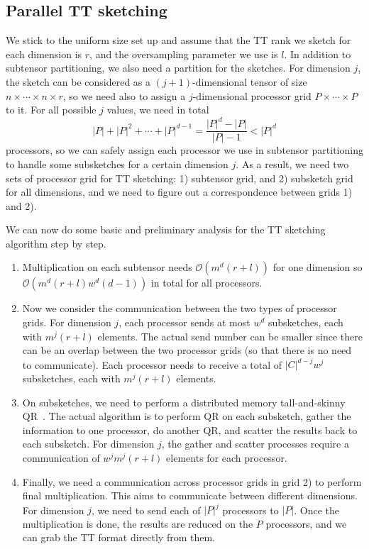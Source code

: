 \documentclass[11pt,a4paper,review]{siamart220329}
\begin{document}
\subsection{Parallel TT sketching}
We stick to the uniform size set up and assume that the TT rank we sketch for each dimension is $r$, and the oversampling parameter we use is $l$. In addition to subtensor partitioning, we also need a partition for the sketches. For dimension $j$, the sketch can be considered as a $(j+1)$-dimensional tensor of size $n \times \cdots \times n \times r$, so we need also to assign a $j$-dimensional processor grid $P \times \cdots \times P$ to it. For all possible $j$ values, we need in total
\[ |P|+|P|^2+\cdots+|P|^{d-1} = \frac{|P|^d-|P|}{|P|-1} < |P|^d \]
processors, so we can safely assign each processor we use in subtensor partitioning to handle some subsketches for a certain dimension $j$. As a result, we need two sets of processor grid for TT sketching: 1) subtensor grid, and 2) subsketch grid for all dimensions, and we need to figure out a correspondence between grids 1) and 2).

We can now do some basic and preliminary analysis for the TT sketching algorithm step by step.
\begin{enumerate}
\item Multiplication on each subtensor needs $\mathcal{O}(m^d(r+l))$ for one dimension so $\mathcal{O}(m^d(r+l)w^d(d-1))$ in total for all processors.

\item Now we consider the communication between the two types of processor grids. For dimension $j$, each processor sends at most $w^d$ subsketches, each with $m^j(r+l)$ elements. The actual send number can be smaller since there can be an overlap between the two processor grids (so that there is no need to communicate). Each processor needs to receive a total of $|C|^{d-j}w^j$ subsketches, each with $m^j(r+l)$ elements.

\item On subsketches, we need to perform a distributed memory tall-and-skinny QR~\cite{benson2013direct}. The actual algorithm is to perform QR on each subsketch, gather the information to one processor, do another QR, and scatter the results back to each subsketch. For dimension $j$, the gather and scatter processes require a communication of $w^jm^j(r+l)$ elements for each processor.

\item Finally, we need a communication across processor grids in grid 2) to perform final multiplication. This aims to communicate between different dimensions. For dimension $j$, we need to send each of $|P|^j$ processors to $|P|$. Once the multiplication is done, the results are reduced on the $P$ processors, and we can grab the TT format directly from them.

\end{enumerate}
\end{document}
